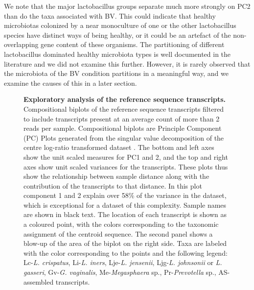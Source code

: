 \documentclass[10pt,letterpaper]{article}
\begin{document}
We note that the major lactobacillus groups separate much more strongly on PC2 than do the taxa associated with BV. This could indicate that healthy microbiotas colonized by a near monoculture of one or the other lactobacillus species have distinct ways of being healthy, or it could be an artefact of the non-overlapping gene content of these organisms. The partitioning of different lactobacillus dominated healthy microbiota types is well documented in the literature \cite{Ravel:2010, Hummelin:2010,macmillan:2015}   and we did not examine this further. However, it is rarely observed that the microbiota of the BV condition partitions in a meaningful way, and we examine the causes of this in a later section.

\begin{figure}[h]
\caption{{\bf Exploratory analysis of the reference sequence transcripts.}
Compositional biplots of the reference sequence transcripts filtered to include transcripts present at an average count of more than 2 reads per sample. Compositional biplots are Principle Component (PC) Plots generated from the singular value decomposition of the centre log-ratio transformed dataset \cite{aitchison2002biplots}. The bottom and left axes show the unit scaled measures for PC1 and 2, and the top and right axes show unit scaled variances for the transcripts. These plots thus show the relationship between sample distance along with the contribution of the transcripts to that distance. In this plot component 1 and 2 explain over 58\% of the variance in the dataset, which is exceptional for a dataset of this complexity. Sample names are shown in black text. The location of each transcript is shown as a coloured point, with the colors corresponding to the taxonomic assignment of the centroid sequence. The second panel shows a blow-up of the area of the biplot on the right side. Taxa are labeled with the  color corresponding to the points and the following legend: Lc-\emph{L. crispatus},  Li-\emph{L. iners},  Lje-\emph{L. jensenii}, Ljg-\emph{L. johnsonii} or \emph{L. gasseri}, Gv-\emph{G. vaginalis}, Me-\emph{Megasphaera} sp., Pr-\emph{Prevotella} sp., AS- assembled transcripts. }
\label{F2:refseq_biplot}
\end{figure}
\end{document}
